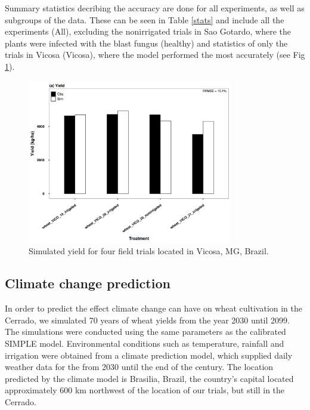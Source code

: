 \documentclass[11pt]{article}
\begin{document}
Summary statistics decribing the accuracy are done for all experiments, as well as subgroups of the data. These can be seen in Table \ref{stats} and include all the experiments (All), excluding the nonirrigated trials in Sao Gotardo, where the plants were infected with the blast fungus (healthy) and statistics of only the trials in Vicosa (Vicosa), where the model performed the most accurately (see Fig \ref{Vicosa}).

\begin{figure}[htbp]
\centering
\includegraphics[width=0.8\textwidth]{../results/experimental-data/2023-02-18_Vico_only.png}
\caption{\label{Vicosa}Simulated yield for four field trials located in Vicosa, MG, Brazil.}
\end{figure}


\subsection{Climate change prediction}
\label{sec:orge3d22d2}
In order to predict the effect climate change can have on wheat cultivation in the Cerrado, we simulated 70 years of wheat yields from the year 2030 until 2099. The simulations were conducted using the same parameters as the calibrated SIMPLE model. Environmental conditions such as temperature, rainfall and irrigation were obtained from a climate prediction model, which supplied daily weather data for the from 2030 until the end of the century. The location predicted by the climate model is Brasilia, Brazil, the country's capital located approximately 600 km northwest of the location of our trials, but still in the Cerrado.
\end{document}
